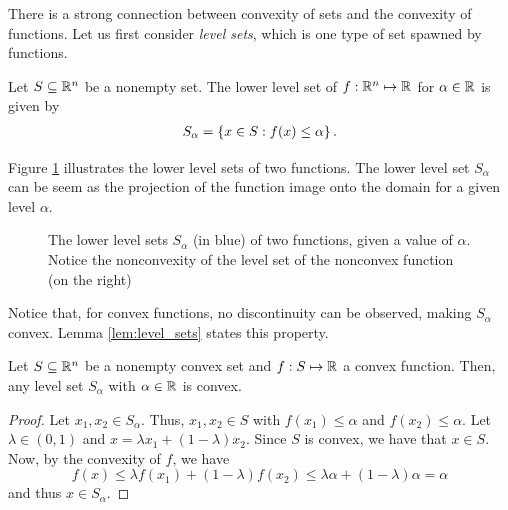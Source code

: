 There is a strong connection between convexity of sets and the convexity of functions. Let us first consider \emph{level sets}, which is one type of set spawned by functions. 

\begin{definition}
	Let $S \subseteq \mathbb{R}^n$\hspace{-1pt} be a nonempty set. The lower level set of $f: \mathbb{R}^n \mapsto \mathbb{R}$ for $\alpha \in \mathbb{R}$ is given by
	\begin{align*}
		S_\alpha = \left\{ x \in S : f(x) \leq \alpha \right \}.
	\end{align*}
\end{definition}

Figure \ref{fig:sublevels} illustrates the lower level sets of two functions. The lower level set $S_\alpha$ can be seem as the projection of the function image onto the domain for a given level $\alpha$. 

\begin{figure}[H]
	\caption{The lower level sets $S_\alpha$ (in blue) of two functions, given a value of $\alpha$. Notice the nonconvexity of the level set of the nonconvex function (on the right)} \label{fig:sublevels}
\end{figure}

Notice that, for convex functions, no discontinuity can be observed, making $S_\alpha$ convex. Lemma \ref{lem:level_sets} states this property.

\begin{lemma}\label{lem:level_sets}
	Let $S \subseteq \mathbb{R}^n$ be a nonempty convex set and $f:S \mapsto \mathbb{R}$ a convex function. Then, any level set $S_\alpha$ with $\alpha \in \mathbb{R}$ is convex. 
\end{lemma} 
%
\begin{proof}
	Let $x_1, x_2 \in S_\alpha$. Thus, $x_1, x_2 \in S$ with $f(x_1) \leq \alpha$ and $f(x_2) \leq \alpha$. Let $\lambda \in (0,1)$ and $x = \lambda x_1 + (1-\lambda)x_2$. Since $S$ is convex, we have that $x \in S$. Now, by the convexity of $f$, we have 
	$$ f(x) \leq \lambda f(x_1) + (1 - \lambda)f(x_2) \leq \lambda\alpha + (1 - \lambda)\alpha = \alpha
	$$
	and thus $x \in S_\alpha$.
\end{proof}

